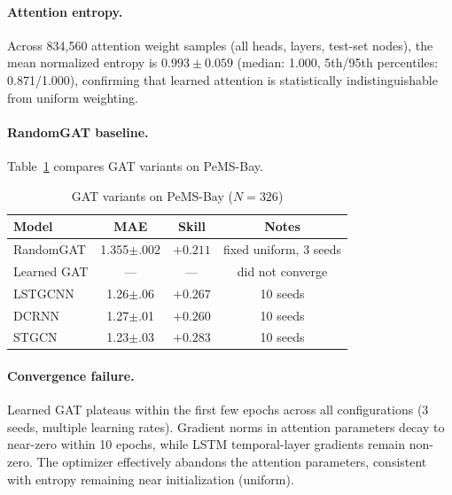 \documentclass[letterpaper]{article}
\begin{document}
\paragraph{Attention entropy.}
Across 834{,}560 attention weight samples (all heads, layers, test-set nodes), the mean normalized entropy is $0.993 \pm 0.059$ (median: 1.000, 5th/95th percentiles: 0.871/1.000), confirming that learned attention is statistically indistinguishable from uniform weighting.

\paragraph{RandomGAT baseline.}
Table~\ref{tab:randomgat_app} compares GAT variants on PeMS-Bay.

\begin{table}[t]
\small
\centering
\caption{GAT variants on PeMS-Bay ($N = 326$)}
\label{tab:randomgat_app}
\begin{tabular}{lccc}
\toprule
Model & MAE & Skill & Notes \\
\midrule
RandomGAT    & 1.355$\pm$.002 & $+0.211$ & fixed uniform, 3 seeds \\
Learned GAT  & --- & --- & did not converge \\
\midrule
LSTGCNN      & 1.26$\pm$.06 & $+0.267$ & 10 seeds \\
DCRNN        & 1.27$\pm$.01 & $+0.260$ & 10 seeds \\
STGCN        & 1.23$\pm$.03 & $+0.283$ & 10 seeds \\
\bottomrule
\end{tabular}
\end{table}

\paragraph{Convergence failure.}
Learned GAT plateaus within the first few epochs across all configurations (3 seeds, multiple learning rates). Gradient norms in attention parameters decay to near-zero within 10 epochs, while LSTM temporal-layer gradients remain non-zero. The optimizer effectively abandons the attention parameters, consistent with entropy remaining near initialization (uniform).
\end{document}
